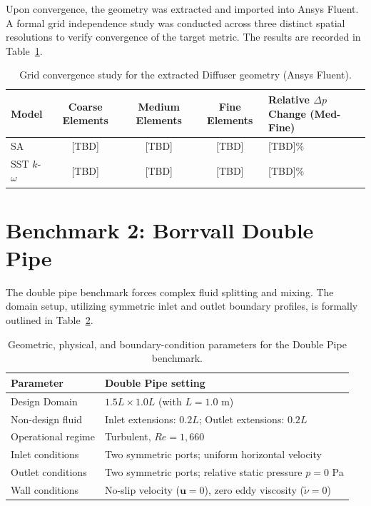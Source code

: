 Upon convergence, the geometry was extracted and imported into Ansys Fluent. A formal grid independence study was conducted across three distinct spatial resolutions to verify convergence of the target metric. The results are recorded in Table~\ref{tab:app_diffuser_mesh}.

\begin{table}[htbp]
	\centering
	\footnotesize
	\caption{Grid convergence study for the extracted Diffuser geometry (Ansys Fluent).}
	\label{tab:app_diffuser_mesh}
	\renewcommand{\arraystretch}{1.2}
	\begin{tabularx}{\textwidth}{l c c c X}
		\hline
		\textbf{Model} & \textbf{Coarse Elements} & \textbf{Medium Elements} & \textbf{Fine Elements} & \textbf{Relative $\Delta p$ Change (Med-Fine)} \\
		\hline
		SA & [TBD] & [TBD] & [TBD] & [TBD]\% \\
		SST $k$-$\omega$ & [TBD] & [TBD] & [TBD] & [TBD]\% \\
		\hline
	\end{tabularx}
\end{table}

\section{Benchmark 2: Borrvall Double Pipe}
\label{app:config_doublepipe}

The double pipe benchmark forces complex fluid splitting and mixing. The domain setup, utilizing symmetric inlet and outlet boundary profiles, is formally outlined in Table~\ref{tab:app_doublepipe_physical}.

\begin{table}[htbp]
	\centering
	\footnotesize
	\caption{Geometric, physical, and boundary-condition parameters for the Double Pipe benchmark.}
	\label{tab:app_doublepipe_physical}
	\renewcommand{\arraystretch}{1.2}
	\begin{tabularx}{\textwidth}{l X}
		\hline
		\textbf{Parameter} & \textbf{Double Pipe setting} \\
		\hline
		Design Domain & $1.5L \times 1.0L$ (with $L = 1.0$ m) \\
		Non-design fluid & Inlet extensions: $0.2L$; Outlet extensions: $0.2L$ \\
		Operational regime & Turbulent, $Re = 1{,}660$ \\
		Inlet conditions & Two symmetric ports; uniform horizontal velocity \\
		Outlet conditions & Two symmetric ports; relative static pressure $p = 0$ Pa \\
		Wall conditions & No-slip velocity ($\mathbf{u} = 0$), zero eddy viscosity ($\tilde{\nu} = 0$) \\
		\hline
	\end{tabularx}
\end{table}

